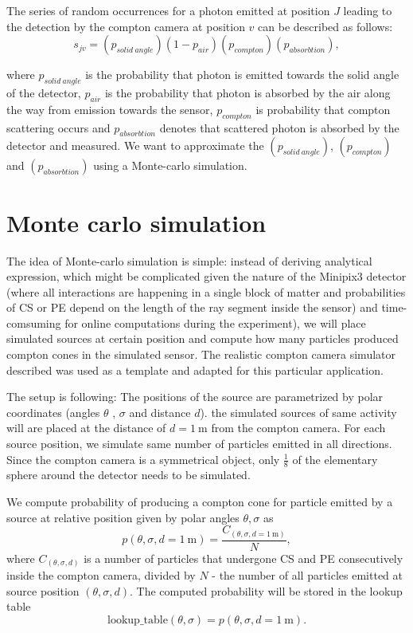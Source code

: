The series of random occurrences for a photon emitted at position $J$ leading to the detection by the compton camera at position $v$ can be described as follows:
\begin{equation}
  s_{jv} =  (p_{solid\ angle})(1-p_{air})(p_{compton})(p_{absorbtion}),
\end{equation}

where $p_{solid\ angle}$ is the probability that photon is emitted towards the solid angle of the detector, $p_{air}$ is the probability that photon is absorbed by the air along the way from emission towards the sensor, $p_{compton}$ is probability that compton scattering occurs and $p_{absorbtion}$ denotes that scattered photon is absorbed by the detector and measured.
We want to approximate the $(p_{solid\ angle})$, $(p_{compton})$ and $(p_{absorbtion})$ using a Monte-carlo simulation.

\section{Monte carlo simulation}
The idea of Monte-carlo simulation is simple:
instead of deriving analytical expression,
which might be complicated given the nature of the Minipix3 detector (where all interactions are happening in a single block of matter and probabilities of \ac{CS} or \ac{PE} depend on the length of the ray segment inside the sensor) and time-comsuming for online computations during the experiment),
we will place simulated sources at certain position and compute how many particles produced compton cones in the simulated sensor.
The realistic compton camera simulator described \cite{baca2019timepix} was used as a template and adapted for this particular application.

The setup is following:
The positions of the source are parametrized by polar coordinates (angles $\theta$ , $\sigma$ and distance $d$).
the simulated sources of same activity will are placed at the distance of $d = \SI{1}\meter$ from the compton camera.
For each source position, we simulate same number of particles emitted in all directions.
Since the compton camera is a symmetrical object, only $\frac{1}{8}$ of the elementary sphere around the detector needs to be simulated.

We compute probability of producing a compton cone for particle emitted by a source at relative position given by polar angles $\theta, \sigma$ as
\begin{equation}
  p(\theta, \sigma, d = \SI{1}\meter) = \frac{C_{(\theta, \sigma, d = \SI{1}\meter)}}{N},
\end{equation} 
where $C_{(\theta, \sigma, d)}$ is a number of particles that undergone \ac{CS} and \ac{PE} consecutively inside the compton camera, divided by $N$ - the number of all particles emitted at source position $(\theta, \sigma, d)$. 
The computed probability will be stored in the lookup table 
\begin{equation}
  \mathrm{lookup\_table}(\theta, \sigma) = p(\theta, \sigma, d = \SI{1}\meter).
\end{equation}

